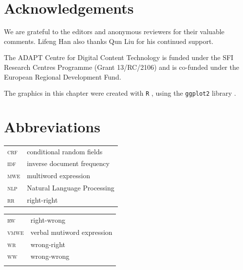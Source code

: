 \documentclass[output=paper,modfonts,nonflat]{langsci/langscibook}
\begin{document}
\section*{Acknowledgements}

We are grateful to the editors and anonymous reviewers for their valuable comments. Lifeng Han also thanks Qun Liu for his continued support. 

The ADAPT Centre for Digital Content Technology is funded under the SFI Research Centres Programme (Grant 13/RC/2106) and is co-funded under the European Regional Development Fund.



The graphics in this chapter were created with \texttt{R} \citep{R}, using the \texttt{ggplot2} library \citep{ggplot2}.


\section*{Abbreviations}

   \begin{tabularx}{.48\textwidth}{ll}
    \textsc{crf} & conditional random fields\\
   \textsc{idf}  & inverse document frequency\\  \textsc{mwe}  & multiword expression\\
  \textsc{nlp}  & Natural Language Processing\\
 \textsc{rr}  & right-right\\
      \end{tabularx}
      \begin{tabularx}{.48\textwidth}{ll}
 \textsc{rw}  & right-wrong\\
   \textsc{vmwe}  & verbal mutiword expression\\  \textsc{wr}  & wrong-right\\
  \textsc{ww}  & wrong-wrong\\
  \\
  \end{tabularx}


{\sloppy
\printbibliography[heading=subbibliography,notkeyword=this]
}
\end{document}
